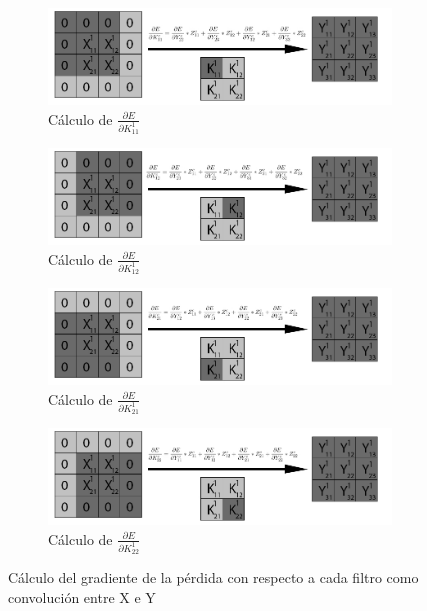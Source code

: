 \begin{figure}[H]
	\centering
	\begin{subfigure}{.5\textwidth}
		\hspace{-25mm}
		\includegraphics[width=1.4\linewidth]{imagenes/conv_back_pad_1.jpg}  
		\caption{Cálculo de $\frac{\partial E}{\partial K^1_{11}}$}
	\end{subfigure}%
	\begin{subfigure}{.5\textwidth}
		\hspace{5mm}
		\includegraphics[width=1.4\linewidth]{imagenes/conv_back_pad_2.jpg}  
		\caption{Cálculo de $\frac{\partial E}{\partial K^1_{12}}$}
	\end{subfigure}
	\vspace{5mm}
	\begin{subfigure}{.5\textwidth}
		\hspace{-25mm}
		\includegraphics[width=1.4\linewidth]{imagenes/conv_back_pad_3.jpg}  
		\caption{Cálculo de $\frac{\partial E}{\partial K^1_{21}}$}
	\end{subfigure}%
	\begin{subfigure}{.5\textwidth}
		\hspace{5mm}
		\includegraphics[width=1.4\linewidth]{imagenes/conv_back_pad_4.jpg}  
		\caption{Cálculo de $\frac{\partial E}{\partial K^1_{22}}$}
	\end{subfigure}
	\caption{Cálculo del gradiente de la pérdida con respecto a cada filtro como convolución entre X e Y}
	\label{fig:conv_backprop_como_convolucion_Xpad_Y}
\end{figure}

